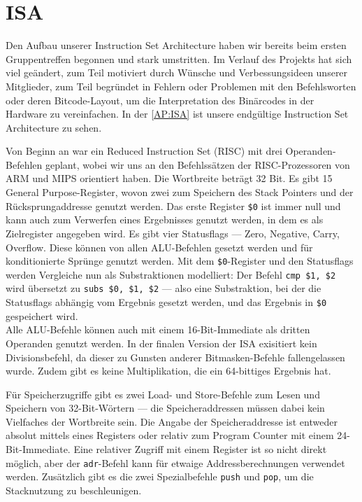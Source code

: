 \section{ISA}
Den Aufbau unserer Instruction Set Architecture haben wir bereits beim ersten Gruppentreffen begonnen und stark umstritten.
Im Verlauf des Projekts hat sich viel geändert, zum Teil motiviert durch Wünsche und Verbessungsideen unserer Mitglieder,
zum Teil begründet in Fehlern oder Problemen mit den Befehlsworten oder deren Bitcode-Layout, um die Interpretation des Binärcodes in der Hardware zu vereinfachen.
In der \autoref{AP:ISA} ist unsere endgültige Instruction Set Architecture zu sehen.

Von Beginn an war ein Reduced Instruction Set (RISC) mit drei Operanden-Befehlen geplant,
wobei wir uns an den Befehlssätzen der RISC-Prozessoren von ARM und MIPS orientiert haben.
Die Wortbreite beträgt 32 Bit. Es gibt 15 General Purpose-Register, wovon zwei zum Speichern des Stack Pointers und der Rücksprungaddresse genutzt werden.
Das erste Register \texttt{\$0} ist immer null und kann auch zum Verwerfen eines Ergebnisses genutzt werden, in dem es als Zielregister angegeben wird.
Es gibt vier Statusflags --- Zero, Negative, Carry, Overflow.
Diese können von allen ALU-Befehlen gesetzt werden und für konditionierte Sprünge genutzt werden.
Mit dem \texttt{\$0}-Register und den Statusflags werden Vergleiche nun als Substraktionen modelliert:
Der Befehl \texttt{cmp \$1, \$2} wird übersetzt zu \texttt{subs \$0, \$1, \$2} ---
also eine Substraktion, bei der die Statusflags abhängig vom Ergebnis gesetzt werden, und das Ergebnis in \texttt{\$0} gespeichert wird. \\
Alle ALU-Befehle können auch mit einem 16-Bit-Immediate als dritten Operanden genutzt werden.
In der finalen Version der ISA exisitiert kein Divisionsbefehl, da dieser zu Gunsten anderer Bitmasken-Befehle fallengelassen wurde.
Zudem gibt es keine Multiplikation, die ein 64-bittiges Ergebnis hat.

Für Speicherzugriffe gibt es zwei Load- und Store-Befehle zum Lesen und Speichern von 32-Bit-Wörtern ---
die Speicheraddressen müssen dabei kein Vielfaches der Wortbreite sein.
Die Angabe der Speicheraddresse ist entweder absolut mittels eines Registers oder relativ zum Program Counter mit einem 24-Bit-Immediate.
Eine relativer Zugriff mit einem Register ist so nicht direkt möglich, aber der \texttt{adr}-Befehl kann für etwaige Addressberechnungen verwendet werden.
Zusätzlich gibt es die zwei Spezialbefehle \texttt{push} und \texttt{pop}, um die Stacknutzung zu beschleunigen.


